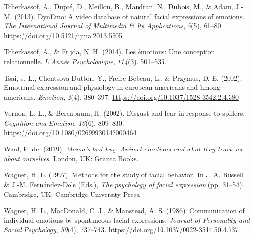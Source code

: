 \documentclass[
  english,
  doc]{apa7}
\newlength{\cslhangindent}
\newenvironment{cslreferences}%
  {\setlength{\parindent}{0pt}%
  \everypar{\setlength{\hangindent}{\cslhangindent}}\ignorespaces}%
  {\par}
\begin{document}
\begin{cslreferences}
\leavevmode\hypertarget{ref-tcherkassof2013dynemo}{}%
Tcherkassof, A., Dupré, D., Meillon, B., Mandran, N., Dubois, M., \& Adam, J.-M. (2013). DynEmo: A video database of natural facial expressions of emotions. \emph{The International Journal of Multimedia \& Its Applications}, \emph{5}(5), 61--80. \url{https://doi.org/10.5121/ijma.2013.5505}

\leavevmode\hypertarget{ref-tcherkassof2014emotions}{}%
Tcherkassof, A., \& Frijda, N. H. (2014). Les émotions: Une conception relationnelle. \emph{L'Année Psychologique}, \emph{114}(3), 501--535.

\leavevmode\hypertarget{ref-tsai2002emotional}{}%
Tsai, J. L., Chentsova-Dutton, Y., Freire-Bebeau, L., \& Przymus, D. E. (2002). Emotional expression and physiology in european americans and hmong americans. \emph{Emotion}, \emph{2}(4), 380--397. \url{https://doi.org/10.1037/1528-3542.2.4.380}

\leavevmode\hypertarget{ref-vernon2002disgust}{}%
Vernon, L. L., \& Berenbaum, H. (2002). Disgust and fear in response to spiders. \emph{Cognition and Emotion}, \emph{16}(6), 809--830. \url{https://doi.org/10.1080/02699930143000464}

\leavevmode\hypertarget{ref-de2019mama}{}%
Waal, F. de. (2019). \emph{Mama's last hug: Animal emotions and what they teach us about ourselves}. London, UK: Granta Books.

\leavevmode\hypertarget{ref-wagner1997methods}{}%
Wagner, H. L. (1997). Methods for the study of facial behavior. In J. A. Russell \& J.-M. Fernández-Dols (Eds.), \emph{The psychology of facial expression} (pp. 31--54). Cambridge, UK: Cambridge University Press.

\leavevmode\hypertarget{ref-wagner1986communication}{}%
Wagner, H. L., MacDonald, C. J., \& Manstead, A. S. (1986). Communication of individual emotions by spontaneous facial expressions. \emph{Journal of Personality and Social Psychology}, \emph{50}(4), 737--743. \url{https://doi.org/10.1037/0022-3514.50.4.737}
\end{cslreferences}

\endgroup
\end{document}
